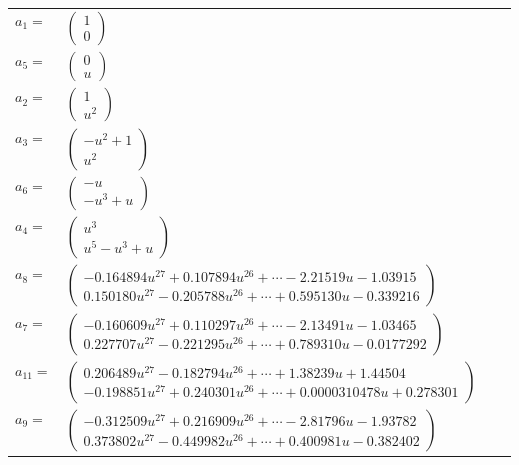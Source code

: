 \documentclass[1p]{elsarticle_modified}
\theoremstyle{definition}
\begin{document}
\begin{tabular}{m{7pt} m{180pt} m{7pt} m{180pt} }
\flushright $a_{1}=$&$\begin{pmatrix}1\\0\end{pmatrix}$ \\
\flushright $a_{5}=$&$\begin{pmatrix}0\\u\end{pmatrix}$ \\
\flushright $a_{2}=$&$\begin{pmatrix}1\\u^2\end{pmatrix}$ \\
\flushright $a_{3}=$&$\begin{pmatrix}- u^2+1\\u^2\end{pmatrix}$ \\
\flushright $a_{6}=$&$\begin{pmatrix}- u\\- u^3+u\end{pmatrix}$ \\
\flushright $a_{4}=$&$\begin{pmatrix}u^3\\u^5- u^3+u\end{pmatrix}$ \\
\flushright $a_{8}=$&$\begin{pmatrix}-0.164894 u^{27}+0.107894 u^{26}+\cdots-2.21519 u-1.03915\\0.150180 u^{27}-0.205788 u^{26}+\cdots+0.595130 u-0.339216\end{pmatrix}$ \\
\flushright $a_{7}=$&$\begin{pmatrix}-0.160609 u^{27}+0.110297 u^{26}+\cdots-2.13491 u-1.03465\\0.227707 u^{27}-0.221295 u^{26}+\cdots+0.789310 u-0.0177292\end{pmatrix}$ \\
\flushright $a_{11}=$&$\begin{pmatrix}0.206489 u^{27}-0.182794 u^{26}+\cdots+1.38239 u+1.44504\\-0.198851 u^{27}+0.240301 u^{26}+\cdots+0.0000310478 u+0.278301\end{pmatrix}$ \\
\flushright $a_{9}=$&$\begin{pmatrix}-0.312509 u^{27}+0.216909 u^{26}+\cdots-2.81796 u-1.93782\\0.373802 u^{27}-0.449982 u^{26}+\cdots+0.400981 u-0.382402\end{pmatrix}$ \\

\end{tabular}
\end{document}
